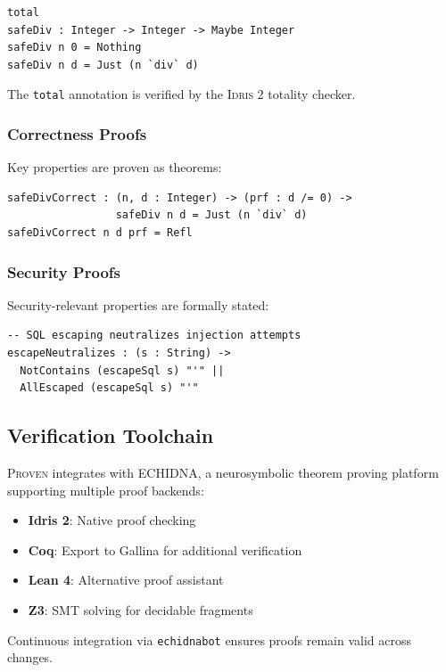 \documentclass[11pt,a4paper]{article}
\newcommand{\proven}{\textsc{Proven}}
\newcommand{\idris}{\textsc{Idris 2}}
\begin{document}
\begin{lstlisting}
total
safeDiv : Integer -> Integer -> Maybe Integer
safeDiv n 0 = Nothing
safeDiv n d = Just (n `div` d)
\end{lstlisting}

The \texttt{total} annotation is verified by the \idris{} totality checker.

\subsubsection{Correctness Proofs}

Key properties are proven as theorems:

\begin{lstlisting}
safeDivCorrect : (n, d : Integer) -> (prf : d /= 0) ->
                 safeDiv n d = Just (n `div` d)
safeDivCorrect n d prf = Refl
\end{lstlisting}

\subsubsection{Security Proofs}

Security-relevant properties are formally stated:

\begin{lstlisting}
-- SQL escaping neutralizes injection attempts
escapeNeutralizes : (s : String) ->
  NotContains (escapeSql s) "'" ||
  AllEscaped (escapeSql s) "'"
\end{lstlisting}

\subsection{Verification Toolchain}

\proven{} integrates with ECHIDNA, a neurosymbolic theorem proving platform supporting multiple proof backends:

\begin{itemize}
    \item \textbf{Idris 2}: Native proof checking
    \item \textbf{Coq}: Export to Gallina for additional verification
    \item \textbf{Lean 4}: Alternative proof assistant
    \item \textbf{Z3}: SMT solving for decidable fragments
\end{itemize}

Continuous integration via \texttt{echidnabot} ensures proofs remain valid across changes.
\end{document}
